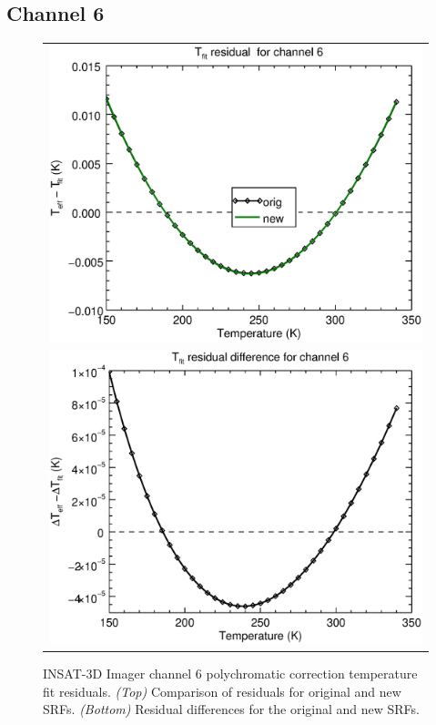 \subsection{Channel 6}
\begin{figure}[H]
  \centering
  \begin{tabular}{c}
    \includegraphics[scale=0.55]{graphics/imgr/tfit/imgr_insat3d-6.tfit.eps} \\
    \includegraphics[scale=0.55]{graphics/imgr/tfit/imgr_insat3d-6.tfit.difference.eps}
  \end{tabular}
  \caption{INSAT-3D Imager channel 6 polychromatic correction temperature fit residuals. \emph{(Top)} Comparison of residuals for original and new SRFs. \emph{(Bottom)} Residual differences for the original and new SRFs.}
  \label{fig:imgr_ch6_tfit}
\end{figure}
